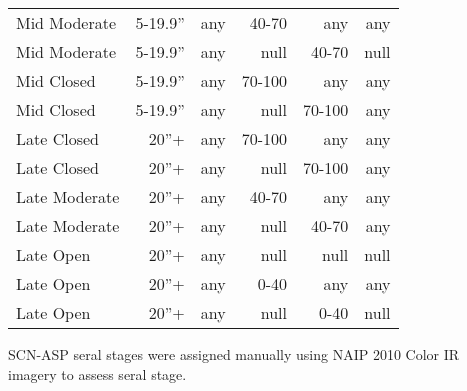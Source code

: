 \begin{table}[hbp]
\begin{tabular}{@{}lrrrrr@{}}
Mid Moderate     & 5-19.9''        & any & 40-70  & any    & any  \\
Mid Moderate     & 5-19.9''        & any & null   & 40-70  & null \\
Mid Closed       & 5-19.9''        & any & 70-100 & any    & any  \\
Mid Closed       & 5-19.9''        & any & null   & 70-100 & any  \\
Late Closed      & 20''+           & any & 70-100 & any    & any  \\
Late Closed      & 20''+           & any & null   & 70-100 & any  \\
Late Moderate    & 20''+           & any & 40-70  & any    & any  \\
Late Moderate    & 20''+           & any & null   & 40-70  & any  \\
Late Open        & 20''+           & any & null   & null   & null \\
Late Open        & 20''+           & any & 0-40   & any    & any  \\
Late Open        & 20''+           & any & null   & 0-40   & null \\ \bottomrule
\end{tabular}
\end{table}

SCN-ASP seral stages were assigned manually using NAIP 2010 Color IR imagery to assess seral stage.


\clearpage

